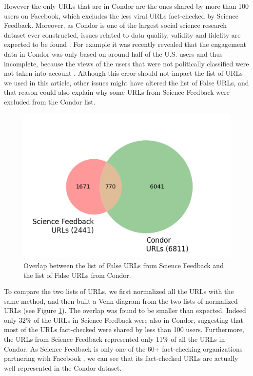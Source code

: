 \documentclass[review]{elsarticle}
\begin{document}
{However the only URLs that are in Condor are the ones shared by more than 100 users on Facebook, which excludes the less viral URLs fact-checked by Science Feedback.
Moreover, as Condor is one of the largest social science research dataset ever constructed, issues related to data quality, validity and fidelity are expected to be found \cite{messing2020facebook}.
For example it was recently revealed that the engagement data in Condor was only based on around half of the U.S. users and thus incomplete, because the views of the users that were not politically classified were not taken into account \citep{NYTrevelations}. 
Although this error should not impact the list of URLs we used in this article, other issues might have altered the list of False URLs, and that reason could also explain why some URLs from Science Feedback were excluded from the Condor list.

\begin{figure}[!h]
\centering
\includegraphics[scale=0.5]{./../figure/supplementary_venn_urls.png}
\caption{
Overlap between the list of False URLs from Science Feedback and the list of False URLs from Condor.
}
\label{venn_urls}
\end{figure}

To compare the two lists of URLs, we first normalized all the URLs with the same method, and then built a Venn diagram from the two lists of normalized URLs (see Figure \ref{venn_urls}). 
The overlap was found to be smaller than expected. 
Indeed only $32\%$ of the URLs in Science Feedback were also in Condor, suggesting that most of the URLs fact-checked were shared by less than 100 users. 
Furthermore, the URLs from Science Feedback represented only $11\%$ of all the URLs in Condor. As Science Feedback is only one of the 60+ fact-checking organizations partnering with Facebook \citep{60factCheckingPartners}, we can see that its fact-checked URLs are actually well represented in the Condor dataset.

}
\end{document}
